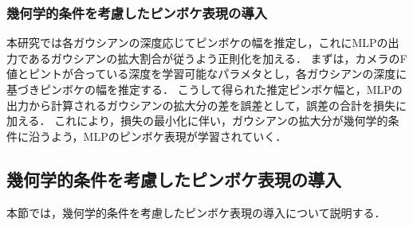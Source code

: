 \subsubsection*{幾何学的条件を考慮したピンボケ表現の導入}
本研究では各ガウシアンの深度応じてピンボケの幅を推定し，これにMLPの出力であるガウシアンの拡大割合が従うよう正則化を加える．
まずは，カメラのF値とピントが合っている深度を学習可能なパラメタとし，各ガウシアンの深度に基づきピンボケの幅を推定する．
こうして得られた推定ピンボケ幅と，MLPの出力から計算されるガウシアンの拡大分の差を誤差として，誤差の合計を損失に加える．
これにより，損失の最小化に伴い，ガウシアンの拡大分が幾何学的条件に沿うよう，MLPのピンボケ表現が学習されていく．

\subsection{幾何学的条件を考慮したピンボケ表現の導入}\label{subsec:introduction_of_blur_expression}
本節では，幾何学的条件を考慮したピンボケ表現の導入について説明する．

